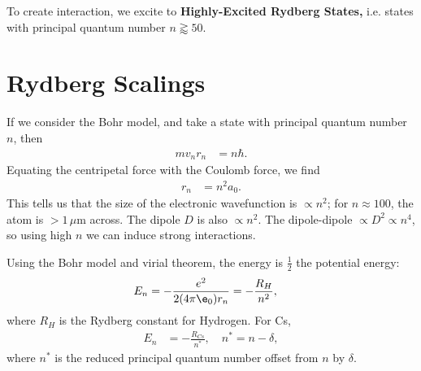 \documentclass[a4paper, 11pt, normalem]{report}
\begin{document}
To create interaction, we excite to \textbf{Highly-Excited Rydberg States,} i.e. states with principal quantum number $n\gtrapprox50$.

\section{Rydberg Scalings}
If we consider the Bohr model, and take a state with principal quantum number $n$, then
\begin{align}
    mv_nr_n &= n\hbar.
\end{align}
Equating the centripetal force with the Coulomb force, we find
\begin{align}
    r_n &= n^2a_0.
\end{align}
This tells us that the size of the electronic wavefunction is $\propto n^2$; for $n\approx100$, the atom is $> 1\,\mu$m across.
The dipole $D$ is also $\propto n^2$.
The dipole-dipole $\propto D^2\propto n^4$, so using high $n$ we can induce strong interactions.

Using the Bohr model and virial theorem, the energy is $\frac12$ the potential energy:
\begin{align}
    E_n &= -\frac{e^2}{2(4\pi\e_0)r_n} = -\frac{R_H}{n^2},
\end{align}
where $R_H$ is the Rydberg constant for Hydrogen.
For Cs,
\begin{align}
    E_n &= - \frac{R_{Cs}}{n^*},\quad n^* = n - \delta,
\end{align}
where $n^*$ is the reduced principal quantum number offset from $n$ by $\delta$.
\end{document}
